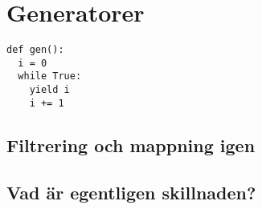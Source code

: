 \mode*

\section{Generatorer}

\begin{frame}[fragile]
  \begin{lstlisting}[basicstyle=\huge,numbers=none]
def gen():
  i = 0
  while True:
    yield i
    i += 1
  \end{lstlisting}
\end{frame}

\subsection{Filtrering och mappning igen}

\begin{frame}[fragile]
  \begin{example}
    
  \end{example}

  \pause

  \begin{example}
    
  \end{example}
\end{frame}

\begin{frame}[fragile]
  \begin{example}
    
  \end{example}

  \pause

  \begin{example}
    
  \end{example}
\end{frame}

\subsection{Vad är egentligen skillnaden?}

\begin{frame}[fragile]
  \begin{example}
    
  \end{example}
\end{frame}

\begin{frame}[fragile]
  \begin{example}
    
  \end{example}
\end{frame}

